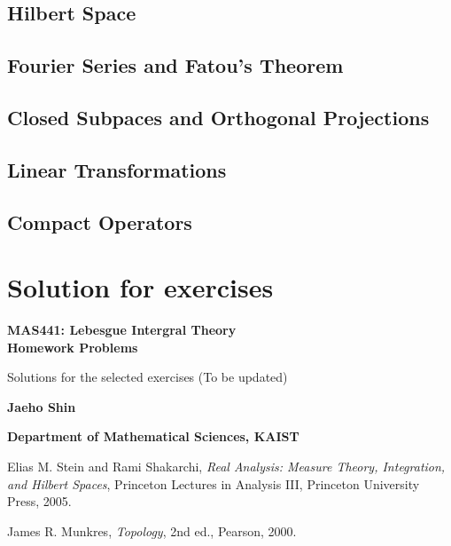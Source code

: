 \documentclass[12pt, a4paper, openany, twoside]{book}
\theoremstyle{definition}
\theoremstyle{remark}
\theoremstyle{plain}
\numberwithin{equation}{section}
\begin{document}
\section{Hilbert Space}
\section{Fourier Series and Fatou's Theorem}
\section{Closed Subpaces and Orthogonal Projections}
\section{Linear Transformations}
\section{Compact Operators}

\newpage
\chapter{Solution for exercises}
\begin{center}
    \vspace*{4cm}
        
    \Huge
    \textbf{MAS441: Lebesgue Intergral Theory\\\vspace{2mm}
    Homework Problems}

    \vspace{1cm}
    \large
    Solutions for the selected exercises (To be updated)
    \vspace{3cm}
    
    \LARGE
    \textbf{Jaeho Shin}
        
    \vspace{5cm}
        
    \normalsize
    \textbf{Department of Mathematical Sciences, KAIST}\\  
\end{center}

\newpage

\begin{thebibliography}{99}

Elias M. Stein and Rami Shakarchi,
\textit{Real Analysis: Measure Theory, Integration, and Hilbert Spaces},
Princeton Lectures in Analysis III, Princeton University Press, 2005.

James R. Munkres,  
\textit{Topology},  
2nd ed., Pearson, 2000.

\end{thebibliography}
\end{document}
